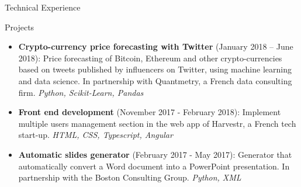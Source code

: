 \documentclass[]{mcdowellcv}
\begin{document}
    \begin{cvsection}{Technical Experience}
        \begin{cvsubsection}{Projects}{}{}
            \begin{itemize}

                \item \textbf{Crypto-currency price forecasting with Twitter} (January 2018 -- June 2018):
                Price forecasting of Bitcoin, Ethereum and other crypto-currencies based on tweets published by influencers on Twitter, using machine learning and data science.
                In partnership with Quantmetry, a French data consulting firm.
                \textit{Python, Scikit-Learn, Pandas}

                \item \textbf{Front end development} (November 2017 - February 2018):
                Implement multiple users management section in the web app of Harvestr, a French tech start-up.
                \textit{HTML, CSS, Typescript, Angular}

                \item \textbf{Automatic slides generator} (February 2017 - May 2017):
                Generator that automatically convert a Word document into a PowerPoint presentation.
                In partnership with the Boston Consulting Group.
                \textit{Python, XML}

            \end{itemize}
        \end{cvsubsection}
    \end{cvsection}
\end{document}
